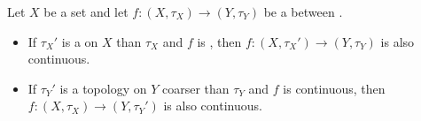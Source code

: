 \begin{proposition} \label{proposition:coarser_and_finer_topologies_and_continuous_maps}
Let $X$ be a set and let $f: (X, \tau_X) \to (Y, \tau_Y)$ be a  between . 
\begin{itemize}
    \item If $\tau_X'$ is a  on $X$  than $\tau_X$ and $f$ is , then $f: (X, \tau_X') \to (Y, \tau_Y)$ is also continuous.
    \item If $\tau_Y'$ is a topology on $Y$ coarser than $\tau_Y$ and $f$ is continuous, then $f: (X, \tau_X) \to (Y, \tau_Y')$ is also continuous.
\end{itemize}
\end{proposition}